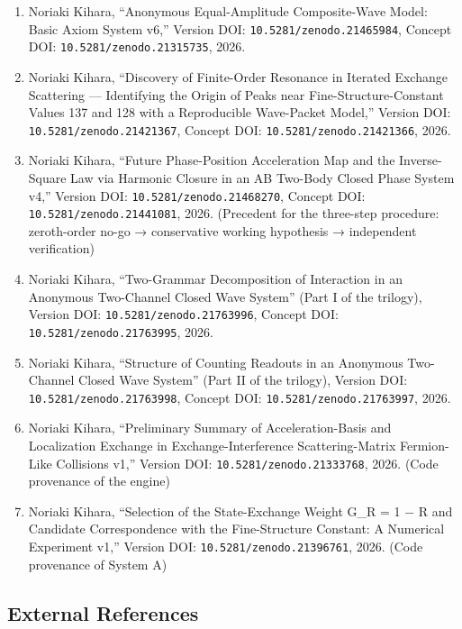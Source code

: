 \documentclass[
  a4paper,
]{article}
\providecommand{\tightlist}{%
  \setlength{\itemsep}{0pt}\setlength{\parskip}{0pt}}
\begin{document}
\begin{enumerate}
\def\labelenumi{\arabic{enumi}.}
\tightlist
\item
  Noriaki Kihara, ``Anonymous Equal-Amplitude Composite-Wave Model:
  Basic Axiom System v6,'' Version DOI:
  \texttt{10.5281/zenodo.21465984}, Concept DOI:
  \texttt{10.5281/zenodo.21315735}, 2026.
\item
  Noriaki Kihara, ``Discovery of Finite-Order Resonance in Iterated
  Exchange Scattering --- Identifying the Origin of Peaks near
  Fine-Structure-Constant Values 137 and 128 with a Reproducible
  Wave-Packet Model,'' Version DOI: \texttt{10.5281/zenodo.21421367},
  Concept DOI: \texttt{10.5281/zenodo.21421366}, 2026.
\item
  Noriaki Kihara, ``Future Phase-Position Acceleration Map and the
  Inverse-Square Law via Harmonic Closure in an AB Two-Body Closed Phase
  System v4,'' Version DOI: \texttt{10.5281/zenodo.21468270}, Concept
  DOI: \texttt{10.5281/zenodo.21441081}, 2026. (Precedent for the
  three-step procedure: zeroth-order no-go → conservative working
  hypothesis → independent verification)
\item
  Noriaki Kihara, ``Two-Grammar Decomposition of Interaction in an
  Anonymous Two-Channel Closed Wave System'' (Part I of the trilogy),
  Version DOI: \texttt{10.5281/zenodo.21763996}, Concept DOI:
  \texttt{10.5281/zenodo.21763995}, 2026.
\item
  Noriaki Kihara, ``Structure of Counting Readouts in an Anonymous
  Two-Channel Closed Wave System'' (Part II of the trilogy), Version
  DOI: \texttt{10.5281/zenodo.21763998}, Concept DOI:
  \texttt{10.5281/zenodo.21763997}, 2026.
\item
  Noriaki Kihara, ``Preliminary Summary of Acceleration-Basis and
  Localization Exchange in Exchange-Interference Scattering-Matrix
  Fermion-Like Collisions v1,'' Version DOI:
  \texttt{10.5281/zenodo.21333768}, 2026. (Code provenance of the
  engine)
\item
  Noriaki Kihara, ``Selection of the State-Exchange Weight G\_R = 1 − R
  and Candidate Correspondence with the Fine-Structure Constant: A
  Numerical Experiment v1,'' Version DOI:
  \texttt{10.5281/zenodo.21396761}, 2026. (Code provenance of System A)
\end{enumerate}

\subsection{External References}\label{external-references}
\end{document}
